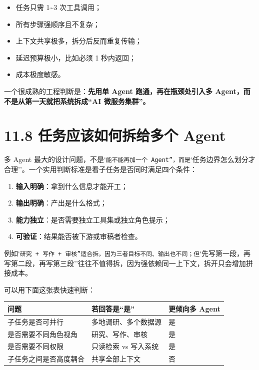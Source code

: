 \begin{itemize}[leftmargin=2em]
\item 任务只需 1\textasciitilde{}3 次工具调用；
\item 所有步骤强顺序且不复杂；
\item 上下文共享极多，拆分后反而重复传输；
\item 延迟预算极小，比如必须 1 秒内返回；
\item 成本极度敏感。
\end{itemize}

一个很成熟的工程判断是：\textbf{先用单 Agent 跑通，再在瓶颈处引入多 Agent，而不是从第一天就把系统拆成``AI 微服务集群''。}


\section{11.8 任务应该如何拆给多个 Agent}

多 Agent 最大的设计问题，不是`\texttt{能不能再加一个 Agent''，而是}`任务边界怎么划分才合理''。一个实用判断标准是看子任务是否同时满足四个条件：


\begin{enumerate}[leftmargin=2em]
\item \textbf{输入明确}：拿到什么信息才能开工；
\item \textbf{输出明确}：产出是什么格式；
\item \textbf{能力独立}：是否需要独立工具集或独立角色提示；
\item \textbf{可验证}：结果能否被下游或审稿者检查。
\end{enumerate}

例如`\texttt{研究 + 写作 + 审核''适合拆，因为三者目标不同、输出也不同；但}`先写第一段，再写第二段，再写第三段''往往不值得拆，因为强依赖同一上下文，拆开只会增加拼接成本。


可以用下面这张表快速判断：


\begingroup
\scriptsize
\setlength{\tabcolsep}{3pt}
\begin{longtable}{|p{}|p{}|p{}|}
\hline
问题 & 若回答是``是'' & 更倾向多 Agent \\ \hline
子任务是否可并行 & 多地调研、多个数据源 & 是 \\ \hline
是否需要不同角色视角 & 研究、写作、审核 & 是 \\ \hline
是否需要不同权限 & 只读检索 vs 写入系统 & 是 \\ \hline
子任务之间是否高度耦合 & 共享全部上下文 & 否 \\ \hline
\end{longtable}
\endgroup

